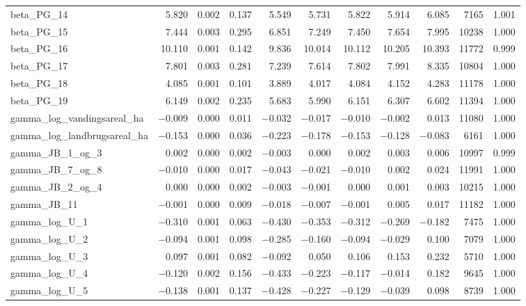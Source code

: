 \documentclass[12pt]{article}
\begin{document}
\begin{longtable}{lrrrrrrrrrr}
beta\_PG\_14 &  5.820 & 0.002 & 0.137 &  5.549 &  5.731 &  5.822 &  5.914 &  6.085 &  7165 & 1.001 \\
beta\_PG\_15 &  7.444 & 0.003 & 0.295 &  6.851 &  7.249 &  7.450 &  7.654 &  7.995 & 10238 & 1.000 \\
beta\_PG\_16 & 10.110 & 0.001 & 0.142 &  9.836 & 10.014 & 10.112 & 10.205 & 10.393 & 11772 & 0.999 \\
beta\_PG\_17 &  7.801 & 0.003 & 0.281 &  7.239 &  7.614 &  7.802 &  7.991 &  8.335 & 10804 & 1.000 \\
beta\_PG\_18 &  4.085 & 0.001 & 0.101 &  3.889 &  4.017 &  4.084 &  4.152 &  4.283 & 11178 & 1.000 \\
beta\_PG\_19 &  6.149 & 0.002 & 0.235 &  5.683 &  5.990 &  6.151 &  6.307 &  6.602 & 11394 & 1.000 \\
\addlinespace
gamma\_log\_vandingsareal\_ha  & $-$0.009 & 0.000 & 0.011 & $-$0.032 & $-$0.017 & $-$0.010 & $-$0.002 &  0.013 & 11080 & 1.000 \\
gamma\_log\_landbrugsareal\_ha & $-$0.153 & 0.000 & 0.036 & $-$0.223 & $-$0.178 & $-$0.153 & $-$0.128 & $-$0.083 &  6161 & 1.000 \\
gamma\_JB\_1\_og\_3  &  0.002 & 0.000 & 0.002 & $-$0.003 &  0.000 &  0.002 &  0.003 &  0.006 & 10997 & 0.999 \\
gamma\_JB\_7\_og\_8  & $-$0.010 & 0.000 & 0.017 & $-$0.043 & $-$0.021 & $-$0.010 &  0.002 &  0.024 & 11991 & 1.000 \\
gamma\_JB\_2\_og\_4  &  0.000 & 0.000 & 0.002 & $-$0.003 & $-$0.001 &  0.000 &  0.001 &  0.003 & 10215 & 1.000 \\
gamma\_JB\_11        & $-$0.001 & 0.000 & 0.009 & $-$0.018 & $-$0.007 & $-$0.001 &  0.005 &  0.017 & 11182 & 1.000 \\
gamma\_log\_U\_1  & $-$0.310 & 0.001 & 0.063 & $-$0.430 & $-$0.353 & $-$0.312 & $-$0.269 & $-$0.182 &  7475 & 1.000 \\
gamma\_log\_U\_2  & $-$0.094 & 0.001 & 0.098 & $-$0.285 & $-$0.160 & $-$0.094 & $-$0.029 &  0.100 &  7079 & 1.000 \\
gamma\_log\_U\_3  &  0.097 & 0.001 & 0.082 & $-$0.092 &  0.050 &  0.106 &  0.153 &  0.232 &  5710 & 1.000 \\
gamma\_log\_U\_4  & $-$0.120 & 0.002 & 0.156 & $-$0.433 & $-$0.223 & $-$0.117 & $-$0.014 &  0.182 &  9645 & 1.000 \\
gamma\_log\_U\_5  & $-$0.138 & 0.001 & 0.137 & $-$0.428 & $-$0.227 & $-$0.129 & $-$0.039 &  0.098 &  8739 & 1.000 \\

\end{longtable}
\end{document}

